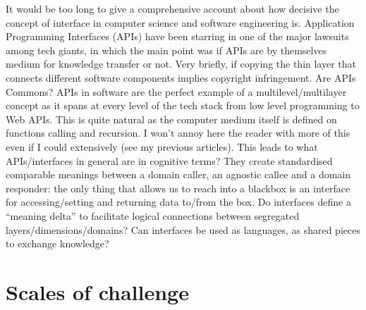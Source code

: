 \documentclass[14pt,a4paper]{extarticle}
\begin{document}
\hspace*{15mm}It would be too long to give a comprehensive account about how decisive the concept of interface in computer science and software engineering is. Application Programming Interfaces (APIs) have been starring in one of the major lawsuits among tech giants, in which the main point was if APIs are by themselves medium for knowledge transfer or not. Very briefly, if copying the thin layer that connects different software components implies copyright infringement. Are APIs Commons?
APIs in software are the perfect example of a multilevel/multilayer concept as it spans at every level of the tech stack from low level programming to Web APIs. This is quite natural as the computer medium itself is defined on functions calling and recursion. I won’t annoy here the reader with more of this even if I could extensively (see my previous articles).
\newline
\hspace*{15mm}This leads to what APIs/interfaces in general are in cognitive terms? They create standardised comparable meanings between a domain caller, an agnostic callee and a domain responder: the only thing that allows us to reach into a blackbox is an interface for accessing/setting and returning  data to/from the box. Do interfaces define a “meaning delta” to facilitate logical connections between segregated layers/dimensions/domains? Can interfaces be used as languages, as shared pieces to exchange knowledge?


\section*{Scales of challenge}
\label{sec:scales}%
\end{document}
